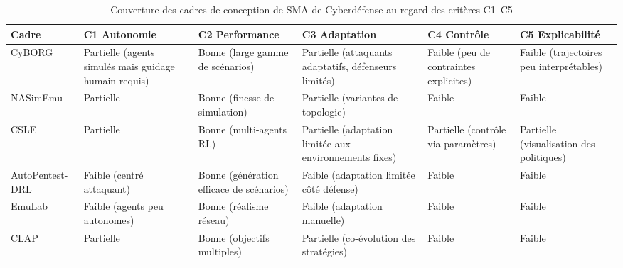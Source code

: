 \begin{table}[t]
  \centering
  \caption{Couverture des cadres de conception de SMA de Cyberdéfense au regard des critères C1--C5}
  \label{tab:revue-cadres-conception}
  \renewcommand{\arraystretch}{1.2}
  \tiny
  \begin{tabularx}{\textwidth}{
    p{1.5cm}
    >{\centering\arraybackslash}p{2.25cm}
    >{\centering\arraybackslash}p{2.25cm}
    >{\centering\arraybackslash}p{2.25cm}
    >{\centering\arraybackslash}p{2.25cm}
    >{\centering\arraybackslash}p{2.25cm}}
    \toprule
    \textbf{Cadre}  & \textbf{C1 Autonomie}                                 & \textbf{C2 Performance}                     & \textbf{C3 Adaptation}                                  & \textbf{C4 Contrôle}                   & \textbf{C5 Explicabilité}                \\
    \midrule
    CyBORG          & Partielle (agents simulés mais guidage humain requis) & Bonne (large gamme de scénarios)            & Partielle (attaquants adaptatifs, défenseurs limités)   & Faible (peu de contraintes explicites) & Faible (trajectoires peu interprétables) \\
    NASimEmu        & Partielle                                             & Bonne (finesse de simulation)               & Partielle (variantes de topologie)                      & Faible                                 & Faible                                   \\
    CSLE            & Partielle                                             & Bonne (multi-agents RL)                     & Partielle (adaptation limitée aux environnements fixes) & Partielle (contrôle via paramètres)    & Partielle (visualisation des politiques) \\
    AutoPentest-DRL & Faible (centré attaquant)                             & Bonne (génération efficace de scénarios)    & Faible (adaptation limitée côté défense)                & Faible                                 & Faible                                   \\
    EmuLab          & Faible (agents peu autonomes)                         & Bonne (réalisme réseau)                     & Faible (adaptation manuelle)                            & Faible                                 & Faible                                   \\
    CLAP            & Partielle                                             & Bonne (objectifs multiples)                 & Partielle (co-évolution des stratégies)                 & Faible                                 & Faible                                   \\

\end{tabularx}
\end{table}
